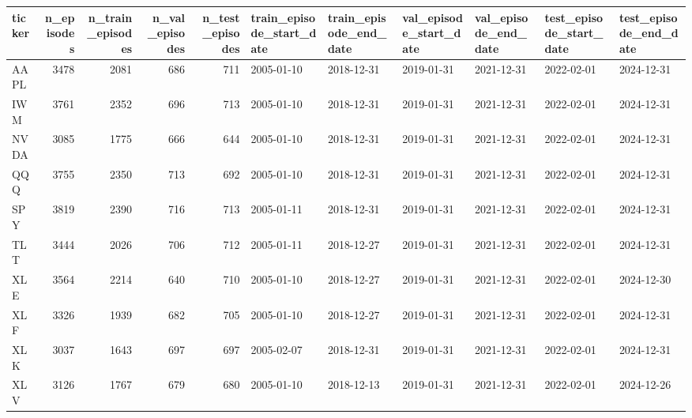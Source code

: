 \begin{tabular}{lrrrrllllll}
\toprule
ticker & n\_episodes & n\_train\_episodes & n\_val\_episodes & n\_test\_episodes & train\_episode\_start\_date & train\_episode\_end\_date & val\_episode\_start\_date & val\_episode\_end\_date & test\_episode\_start\_date & test\_episode\_end\_date \\
\midrule
AAPL & 3478 & 2081 & 686 & 711 & 2005-01-10 & 2018-12-31 & 2019-01-31 & 2021-12-31 & 2022-02-01 & 2024-12-31 \\
IWM & 3761 & 2352 & 696 & 713 & 2005-01-10 & 2018-12-31 & 2019-01-31 & 2021-12-31 & 2022-02-01 & 2024-12-31 \\
NVDA & 3085 & 1775 & 666 & 644 & 2005-01-10 & 2018-12-31 & 2019-01-31 & 2021-12-31 & 2022-02-01 & 2024-12-31 \\
QQQ & 3755 & 2350 & 713 & 692 & 2005-01-10 & 2018-12-31 & 2019-01-31 & 2021-12-31 & 2022-02-01 & 2024-12-31 \\
SPY & 3819 & 2390 & 716 & 713 & 2005-01-11 & 2018-12-31 & 2019-01-31 & 2021-12-31 & 2022-02-01 & 2024-12-31 \\
TLT & 3444 & 2026 & 706 & 712 & 2005-01-11 & 2018-12-27 & 2019-01-31 & 2021-12-31 & 2022-02-01 & 2024-12-31 \\
XLE & 3564 & 2214 & 640 & 710 & 2005-01-10 & 2018-12-27 & 2019-01-31 & 2021-12-31 & 2022-02-01 & 2024-12-30 \\
XLF & 3326 & 1939 & 682 & 705 & 2005-01-10 & 2018-12-27 & 2019-01-31 & 2021-12-31 & 2022-02-01 & 2024-12-31 \\
XLK & 3037 & 1643 & 697 & 697 & 2005-02-07 & 2018-12-31 & 2019-01-31 & 2021-12-31 & 2022-02-01 & 2024-12-31 \\
XLV & 3126 & 1767 & 679 & 680 & 2005-01-10 & 2018-12-13 & 2019-01-31 & 2021-12-31 & 2022-02-01 & 2024-12-26 \\
\bottomrule
\end{tabular}
